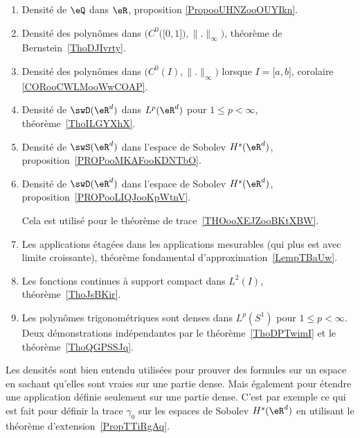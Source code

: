          \label{THEooPUIIooLDPUuq}
\begin{enumerate}
    \item
        Densité de \( \eQ\) dans \( \eR\), proposition \ref{PropooUHNZooOUYIkn}.
    \item
        Densité des polynômes dans \( \Big( C^0\big( \mathopen[ 0 , 1 \mathclose] \big),\| . \|_{\infty} \Big)\), théorème de Bernstein~\ref{ThoDJIvrty}.
    \item
        Densité des polynômes dans \( \big( C^0(I),\| . \|_{\infty} \big)\) lorsque \( I=\mathopen[ a , b \mathclose]\), corolaire \ref{CORooCWLMooWwCOAP}.
    \item
        Densité de \( \swD(\eR^d)\) dans \( L^p(\eR^d)\) pour \( 1\leq p<\infty\), théorème~\ref{ThoILGYXhX}.
    \item
        Densité de \( \swS(\eR^d)\) dans l'espace de Sobolev \( H^s(\eR^d)\), proposition~\ref{PROPooMKAFooKDNTbO}.

    \item
        Densité de \( \swD(\eR^d)\) dans l'espace de Sobolev \( H^s(\eR^d)\), proposition~\ref{PROPooLIQJooKpWtnV}.

        Cela est utilisé pour le théorème de trace~\ref{THOooXEJZooBKtXBW}.
    \item
        Les applications étagées dans les applications mesurables (qui plus est avec limite croissante), théorème fondamental d'approximation~\ref{LempTBaUw}.
    \item
        Les fonctions continues à support compact dans \( L^2(I)\), théorème~\ref{ThoJsBKir}.
    \item
        Les polynômes trigonométriques sont denses dans \( L^p(S^1)\) pour \( 1\leq p<\infty\). Deux démonstrations indépendantes par le théorème~\ref{ThoDPTwimI} et le théorème~\ref{ThoQGPSSJq}.
\end{enumerate}
Les densités sont bien entendu utilisées pour prouver des formules sur un espace en sachant qu'elles sont vraies sur une partie dense. Mais également pour étendre une application définie seulement sur une partie dense. C'est par exemple ce qui est fait pour définir la trace \( \gamma_0\) sur les espaces de Sobolev \( H^s(\eR^d)\) en utilisant le théorème d'extension~\ref{PropTTiRgAq}.

